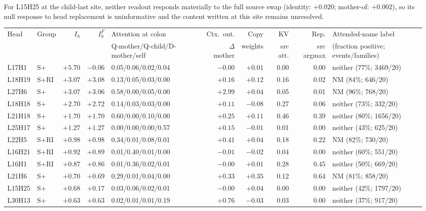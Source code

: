 For L15H25 at the child-last site, neither readout responds materially to
the full source swap (identity: $+0.020$; mother-of: $+0.002$), so its null
response to head replacement is uninformative and the content written at
this site remains unresolved.

\begin{table}[t]
\centering\scriptsize
\setlength{\tabcolsep}{3.5pt}
\begin{tabular}{@{}llrrlrrrrl@{}}
\toprule
Head & Group & $I_h$ & $I_h^{F}$ & Attention at colon & Ctx.\ out. & Copy & KV & Rep. & Attended-name label \\
 & & & & Q-mother/Q-child/D-mother/self & $\Delta$ mother & weights & src att. & src argmax & (fraction positive; events/families) \\
\midrule
L17H1 & S+ & $+5.70$ & $-0.06$ & 0.05/0.06/0.02/0.04 & $-0.00$ & $+0.01$ & 0.00 & 0.00 & neither (77\%; 3469/20) \\
L18H19 & S+RI & $+3.07$ & $+3.08$ & 0.13/0.05/0.03/0.00 & $+0.16$ & $+0.12$ & 0.16 & 0.02 & NM (84\%; 646/20) \\
L27H6 & S+ & $+3.07$ & $+3.06$ & 0.58/0.00/0.05/0.00 & $+2.99$ & $+0.04$ & 0.05 & 0.01 & NM (96\%; 768/20) \\
L18H18 & S+ & $+2.70$ & $+2.72$ & 0.14/0.03/0.03/0.00 & $+0.11$ & $-0.08$ & 0.27 & 0.06 & neither (73\%; 332/20) \\
L21H18 & S+ & $+1.70$ & $+1.70$ & 0.60/0.00/0.10/0.00 & $+0.25$ & $+0.11$ & 0.46 & 0.39 & neither (80\%; 1656/20) \\
L25H17 & S+ & $+1.27$ & $+1.27$ & 0.00/0.00/0.00/0.57 & $+0.15$ & $-0.01$ & 0.01 & 0.00 & neither (43\%; 625/20) \\
L22H5 & S+RI & $+0.98$ & $+0.98$ & 0.34/0.01/0.08/0.01 & $+0.41$ & $+0.04$ & 0.18 & 0.22 & NM (82\%; 730/20) \\
L16H21 & S+RI & $+0.92$ & $+0.89$ & 0.01/0.40/0.01/0.00 & $-0.01$ & $-0.02$ & 0.04 & 0.00 & neither (60\%; 551/20) \\
L16H1 & S+RI & $+0.87$ & $+0.86$ & 0.01/0.36/0.02/0.01 & $-0.00$ & $+0.01$ & 0.28 & 0.45 & neither (50\%; 669/20) \\
L21H6 & S+ & $+0.70$ & $+0.69$ & 0.29/0.01/0.04/0.00 & $+0.33$ & $+0.35$ & 0.12 & 0.64 & NM (81\%; 858/20) \\
L15H25 & S+ & $+0.68$ & $+0.17$ & 0.03/0.06/0.02/0.01 & $-0.00$ & $+0.04$ & 0.00 & 0.00 & neither (42\%; 1797/20) \\
L30H13 & S+ & $+0.63$ & $+0.63$ & 0.02/0.01/0.01/0.19 & $+0.76$ & $-0.03$ & 0.03 & 0.00 & neither (37\%; 917/20) \\

\end{tabular}
\end{table}
